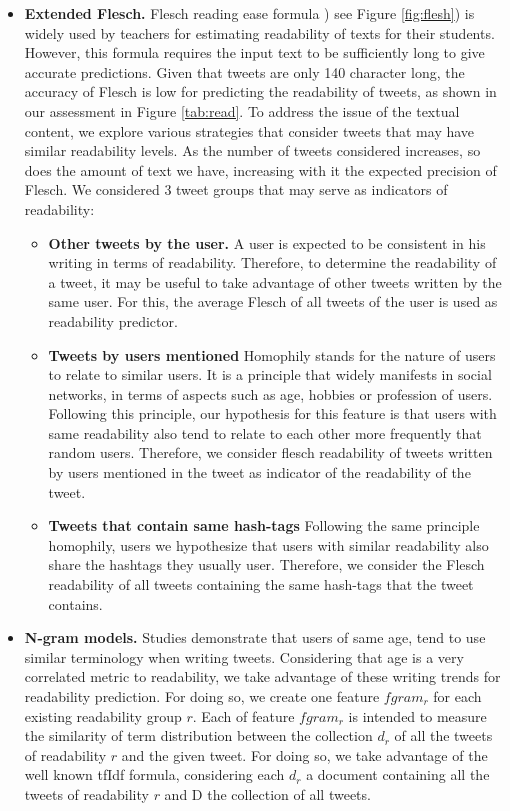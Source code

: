 \documentclass{sig-alternate-05-2015}
\begin{document}
\begin{itemize}
\item \textbf{Extended Flesch.} Flesch reading ease formula ) see Figure \ref{fig:flesh}) is widely used by teachers for estimating readability of texts for their students. However, this formula requires the input text to be sufficiently long to give accurate predictions. Given that tweets are only 140 character long, the accuracy of Flesch is low for predicting the readability of tweets, as shown in our assessment in Figure \ref{tab:read}.  To address the issue of the textual content, we explore various strategies that consider tweets that may have similar readability levels. As the number of tweets considered increases, so does the amount of text we have, increasing with it the expected precision of Flesch. We considered 3 tweet groups that may serve as indicators of readability:

\begin{itemize}
\item \textbf{Other tweets by the user.} A user is expected to be consistent in his writing in terms of readability. Therefore, to determine the readability of a tweet, it may be useful to take advantage of other tweets written by the same user. For this, the average Flesch of all tweets of the user is used as readability predictor.
\item \textbf{Tweets by users mentioned}
Homophily stands for the nature of users to relate to similar users. It is a principle that widely manifests in social networks, in terms of aspects such as age, hobbies or profession of users. Following this principle, our hypothesis for this feature is that users with same readability also tend to relate to each other more frequently that random users. Therefore, we consider flesch readability of tweets written by users mentioned in the tweet as indicator of the readability of the tweet.


\item \textbf{Tweets that contain same hash-tags} Following the same principle homophily, users we hypothesize that users with similar readability also share the hashtags they usually user. Therefore, we consider the Flesch readability of all tweets containing the same hash-tags that the tweet contains.


\end{itemize}


\item \textbf{N-gram models.}
Studies \cite{age} demonstrate that users of same age, tend to use similar terminology when writing tweets. Considering that age is a very correlated metric to readability, we take advantage of these writing trends for readability prediction. For doing so, we create one feature $fgram_r$ for each existing readability group $r$. Each of feature $fgram_r$ is intended to measure the similarity of term distribution between the collection $d_r$ of all the tweets of readability $r$ and the given tweet. For doing so, we take advantage of the well known tfIdf formula, considering each $d_r$ a document containing all the tweets of readability $r$ and D the collection of all tweets.


\end{itemize}
\end{document}
